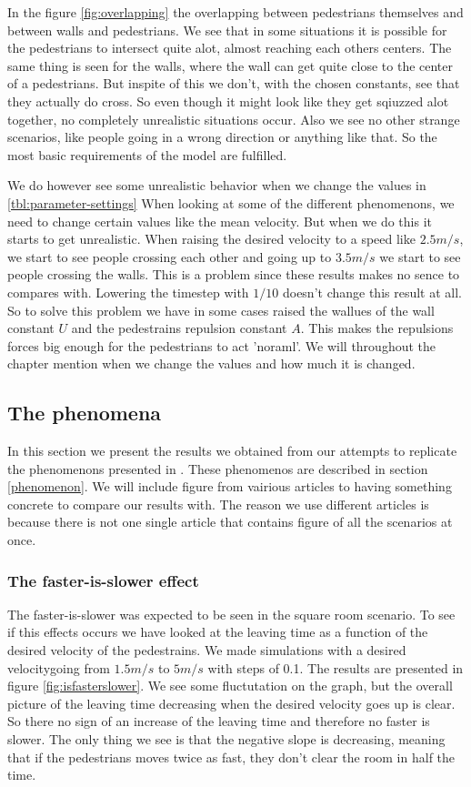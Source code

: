 In the figure \ref{fig:overlapping} the overlapping between pedestrians
themselves and between walls and pedestrians. We see that in some situations
it is possible for the pedestrians to intersect quite alot, almost reaching
each others centers. The same thing is seen for the walls, where the wall
can get quite close to the center of a pedestrians. But inspite of this
we don't, with the chosen constants, see that they actually do cross. So
even though it might look like they get sqiuzzed alot together, no completely
unrealistic situations occur. Also we see no other strange scenarios, like
people going in a wrong direction or anything like that. So the most basic
requirements of the model are fulfilled.

We do however see some unrealistic behavior when we change the values in
\ref{tbl:parameter-settings} When looking at some of the different phenomenons,
we need to change certain values like the mean velocity. But when we do
this it starts to get unrealistic. When raising the desired velocity to
a speed like $2.5m/s$, we start to see people crossing each other and going
up to $3.5m/s$ we start to see people crossing the walls. This is a problem
since these results makes no sence to compares with. Lowering the timestep
with $1/10$ doesn't change this result at all. So to solve this problem we
have in some cases raised the wallues of the wall constant $U$ and the
pedestrains repulsion constant $A$. This makes the repulsions forces
big enough for the pedestrians to act 'noraml'. We will throughout the
chapter mention when we change the values and how much it is changed.

\subsection{The phenomena}\label{subsec:ThePhenomena}
In this section we present the results we obtained from our attempts
to replicate the phenomenons presented in \cite{self-org}. These phenomenos are described in section 
\ref{phenomenon}. We will include figure from vairious articles to having something concrete to compare
our results with. The reason we use different articles is because there is not one single article that contains figure of all the scenarios at once. 

\subsubsection{The faster-is-slower effect}
The faster-is-slower was expected to be seen in the square room scenario.
To see if this effects occurs we have looked at the leaving time as a function
of the desired velocity of the pedestrains. We made simulations with a desired
velocitygoing from $1.5m/s$ to $5m/s$ with steps of 0.1. The results are presented
in figure \ref{fig:isfasterslower}. We see some fluctutation on the graph, but the
overall picture of the leaving time decreasing when the desired velocity goes up is
clear. So there no sign of an increase of the leaving time and therefore no faster
is slower. The only thing we see is that the negative slope is decreasing, meaning
that if the pedestrians moves twice as fast, they don't clear the room in half the
time.

